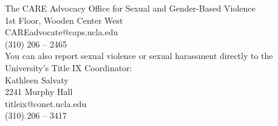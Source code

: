\documentclass[11pt,letter]{article}
\begin{document}
The CARE Advocacy Office for Sexual and Gender-Based Violence\\
1st Floor, Wooden Center West\\
CAREadvocate@caps.ucla.edu\\
(310) 206 -- 2465\\

You can also report sexual violence or sexual harassment directly to the University's Title IX Coordinator:\\

Kathleen Salvaty\\
2241 Murphy Hall\\
titleix@conet.ucla.edu\\
(310) 206 -- 3417

%
%
%
%
%
%
\end{document}
